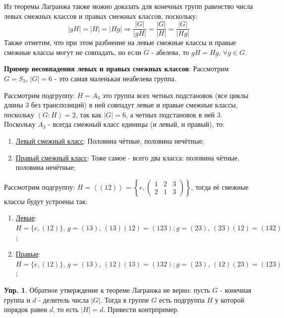 \documentclass[12pt]{article}
\theoremstyle{definition}
\newtheorem{exrc}{Упр.}
\newcommand{\linsp}[1]{\left\langle #1 \right\rangle }
\begin{document}
Из теоремы Лагранжа также можно доказать для конечных групп равенство числа левых смежных классов и правых смежных классов, поскольку:
$$
	|gH| = |H| = |Hg| \Rightarrow \dfrac{|G|}{|gH|} = \dfrac{|G|}{|H|} = \dfrac{|G|}{|Hg|}
$$
Также отметим, что при этом разбиение на левые смежные классы и правые смежные классы могут не совпадать, но если $G$ - абелева, то $gH = Hg, \, \forall g \in G$.

\textbf{Пример несовпадения левых и правых смежных классов}: Рассмотрим $G = S_3, \, |G| = 6$ - это самая маленькая неабелева группа. 

Рассмотрим подгруппу: $H = A_3$ это группа всех четных подстановок (все циклы длины $3$ без транспозиций) в ней совпадут левые и правые смежные классы, поскольку $(G \colon H ) = 2$, так как $|G| = 6$, а четных подстановок в ней $3$. Поскольку $A_3$ - всегда смежный класс единицы (и левый, и правый), то:
\begin{enumerate}[label=\arabic*)]
	\item \uline{Левый смежный класс}: Половина чётные, половина нечётные;
	\item \uline{Правый смежный класс}: Тоже самое - всего два класса: половина чётные, половина нечётные;
\end{enumerate}

Рассмотрим подгруппу: $H = \linsp{(12)}  = \left\{e, 
\begin{pmatrix}
	1 & 2 & 3 \\
	2 & 1 & 3
\end{pmatrix}\right\}$, тогда её смежные классы будут устроены так:

\begin{enumerate}[label=\arabic*)]
	\item \uline{Левые}: $H = \{e,(12)\}, \, g = (13), \, (13)(12) = (123); g = (23), \, (23)(12) = (132)$;
	\item \uline{Правые}: $H = \{e,(12)\}, \, g = (13), \, (12)(13) = (132); g = (23), \,  (12)(23) = (123)$;
\end{enumerate}

\begin{exrc}
	Обратное утверждение к теореме Лагранжа не верно: пусть $G$ - конечная группа и $d$ - делитель числа $|G|$. Тогда в группе $G$ есть подгруппа $H$ у которой порядок равен $d$, то есть $|H| = d$. Привести контрпример.
\end{exrc}
\end{document}

